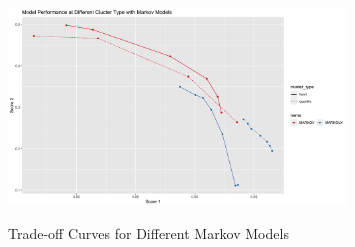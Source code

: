 \documentclass{article}
\begin{document}
\begin{figure}[htbp]
    \caption{Trade-off Curves for Different Markov Models}
    \centering
    \includegraphics[width = 0.8\textwidth]{images/ModelPerformanceatDifferentClucterTypewithMarkovModels.png}
    \label{fig:fig1.3.4}
\end{figure}
\end{document}
